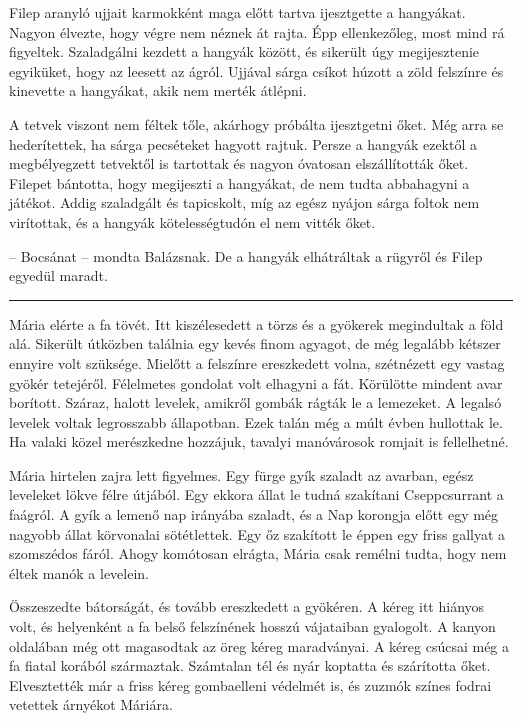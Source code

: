 \documentclass[10pt]{memoir}
\renewcommand{\pfbreakdisplay}{\bigskip \ding{166} \bigskip}
\newcommand{\secbreak}{\fancybreak{\pfbreakdisplay}\indent}
\begin{document}
Filep aranyló ujjait karmokként maga előtt tartva ijesztgette a hangyákat.
Nagyon élvezte, hogy végre nem néznek át rajta. Épp ellenkezőleg, most mind rá
figyeltek. Szaladgálni kezdett a hangyák között, és sikerült úgy megijesztenie
egyiküket, hogy az leesett az ágról. Ujjával sárga csíkot húzott a zöld
felszínre és kinevette a hangyákat, akik nem merték átlépni.

A tetvek viszont nem féltek tőle, akárhogy próbálta ijesztgetni őket. Még arra
se hederítettek, ha sárga pecséteket hagyott rajtuk. Persze a hangyák ezektől a
megbélyegzett tetvektől is tartottak és nagyon óvatosan elszállították őket.
Filepet bántotta, hogy megijeszti a hangyákat, de nem tudta abbahagyni a
játékot. Addig szaladgált és tapicskolt, míg az egész nyájon sárga foltok nem
virítottak, és a hangyák kötelességtudón el nem vitték őket.

-- Bocsánat -- mondta Balázsnak. De a hangyák elhátráltak a rügyről és Filep
egyedül maradt.

\secbreak

Mária elérte a fa tövét. Itt kiszélesedett a törzs és a gyökerek megindultak a
föld alá. Sikerült útközben találnia egy kevés finom agyagot, de még legalább
kétszer ennyire volt szüksége. Mielőtt a felszínre ereszkedett volna,
szétnézett egy vastag gyökér tetejéről. Félelmetes gondolat volt elhagyni a
fát. Körülötte mindent avar borított. Száraz, halott levelek, amikről gombák
rágták le a lemezeket. A legalsó levelek voltak legrosszabb állapotban. Ezek
talán még a múlt évben hullottak le. Ha valaki közel merészkedne hozzájuk,
tavalyi manóvárosok romjait is fellelhetné.

Mária hirtelen zajra lett figyelmes. Egy fürge gyík szaladt az avarban, egész
leveleket lökve félre útjából. Egy ekkora állat le tudná szakítani
Cseppcsurrant a faágról. A gyík a lemenő nap irányába szaladt, és a Nap
korongja előtt egy még nagyobb állat körvonalai sötétlettek. Egy őz szakított
le éppen egy friss gallyat a szomszédos fáról. Ahogy komótosan elrágta, Mária
csak remélni tudta, hogy nem éltek manók a levelein.

Összeszedte bátorságát, és tovább ereszkedett a gyökéren. A kéreg itt hiányos
volt, és helyenként a fa belső felszínének hosszú vájataiban gyalogolt. A
kanyon oldalában még ott magasodtak az öreg kéreg maradványai. A kéreg csúcsai
még a fa fiatal korából származtak. Számtalan tél és nyár koptatta és
szárította őket. Elvesztették már a friss kéreg gombaelleni védelmét is, és
zuzmók színes fodrai vetettek árnyékot Máriára.
\end{document}
